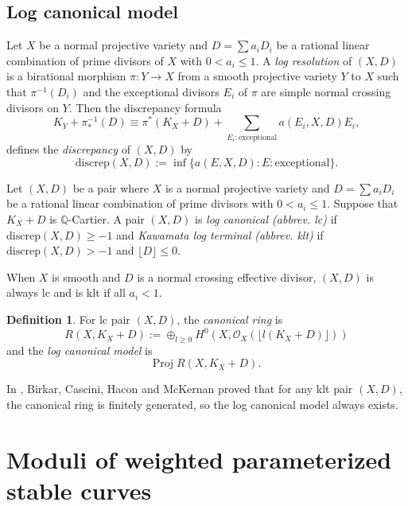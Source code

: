 \documentclass[10pt]{amsart}
\theoremstyle{definition}
\newtheorem{definition}[theorem]{Definition}
\newcommand{\PP}{\mathbb{P}}
\newcommand{\QQ}{\mathbb{Q}}
\newcommand{\cO}{\mathcal{O} }
\newcommand{\proj}{\mathrm{Proj}\;}
\begin{document}

\subsection{Log canonical model}
Let $X$ be a normal projective variety and $D = \sum a_i D_i$ be a
rational linear combination of prime divisors of $X$ with $0 < a_i
\le 1$. A \emph{log resolution} of $(X, D)$ is a birational
morphism $\pi : Y \to X$ from a smooth projective variety $Y$ to
$X$ such that $\pi^{-1}(D_i)$ and the exceptional divisors $E_i$
of $\pi$ are simple normal crossing divisors on $Y$. Then the
discrepancy formula
\[
    K_Y + \pi^{-1}_* (D) \equiv
    \pi^*(K_X + D) + \sum_{E_i : \mbox{exceptional}} a(E_i, X, D)E_i,
\]
defines the \emph{discrepancy} of $(X, D)$ by
\[
    \mathrm{discrep}(X,D) := \inf \{ a(E, X, D) : E : \mbox{exceptional}\}.
\]

Let $(X, D)$ be a pair where $X$ is a normal projective variety
and $D = \sum a_i D_i$ be a rational linear combination of prime
divisors with $0 < a_i \le 1$. Suppose that $K_X + D$ is
$\QQ$-Cartier. A pair $(X, D)$ is \emph{log canonical (abbrev.
lc)} if $\mathrm{discrep}(X,D) \ge -1$ and \emph{Kawamata log
terminal (abbrev. klt)} if $\mathrm{discrep}(X,D) > -1$ and
$\lfloor D \rfloor \le 0$.

When $X$ is smooth and $D$ is a normal crossing effective divisor,
$(X, D)$ is always lc and  is klt if all $a_i < 1$.

\begin{definition}
For lc pair $(X, D)$, the \emph{canonical ring} is
\[
    R(X, K_X + D) := \oplus_{l \ge 0} H^0(X, \cO_X(\lfloor l (K_X + D) \rfloor))
\]
and the \emph{log canonical model} is
\[
    \proj R(X, K_X + D).
\]
\end{definition}
In \cite{BCHM}, Birkar, Cascini, Hacon and McKernan proved that
for any klt pair $(X, D)$, the canonical ring is finitely
generated, so the log canonical model always exists.

\section{Moduli of weighted parameterized stable
curves}\label{sec3}
\end{document}
